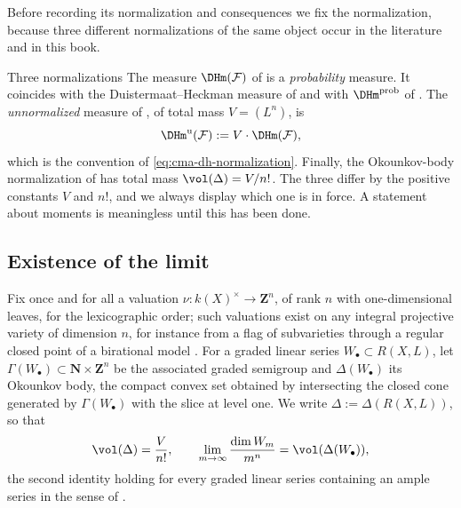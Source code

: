Before recording its normalization and consequences we fix
the normalization, because three different normalizations of the same object
occur in the literature and in this book.

\begin{warning}{Three normalizations}
\label{warn:ch33-dh-normalizations}
The measure $\DHm(\mathcal F)$ of  is a
\emph{probability} measure.  It coincides with the Duistermaat--Heckman
measure of \cite{BHJ17} and with $\DHm^{\mathrm{prob}}$ of
.  The \emph{unnormalized} measure of
, of total mass $V=(L^n)$, is
\begin{equation}
\label{eq:ch33-dh-unnormalized}
 \DHm^{\mathrm u}(\mathcal F):=V\cdot\DHm(\mathcal F),
\end{equation}
which is the convention of \eqref{eq:cma-dh-normalization}.  Finally, the
Okounkov-body normalization of  has total mass
$\vol(\Delta)=V/n!$.  The three differ by the positive constants $V$
and $n!$, and we always display which one is in force.  A statement about
moments is meaningless until this has been done.
\end{warning}

\subsection{Existence of the limit}
\label{sec:ch33-dh-existence}

Fix once and for all a valuation
$\nu:k(X)^\times\to\mathbf Z^n$, of rank $n$ with one-dimensional
leaves, for the lexicographic order; such valuations exist on any integral
projective variety of dimension $n$, for instance from a flag of
subvarieties through a regular closed point of a birational model
\cite{Oko03,LM09,KK12}.  For a graded linear series
$W_\bullet\subset R(X,L)$, let
$\Gamma(W_\bullet)\subset\mathbf N\times\mathbf Z^n$ be the associated
graded semigroup and $\Delta(W_\bullet)$ its Okounkov body, the compact
convex set obtained by intersecting the closed cone generated by
$\Gamma(W_\bullet)$ with the slice at level one.  We write
$\Delta:=\Delta(R(X,L))$, so that
\begin{equation}
\label{eq:ch33-okounkov-volume}
 \vol(\Delta)=\frac{V}{n!},
 \qquad
 \lim_{m\to\infty}\frac{\dim W_m}{m^n}
 =\vol(\Delta(W_\bullet)),
\end{equation}
the second identity holding for every graded linear series containing an
ample series in the sense of \cite{LM09,KK12}.

